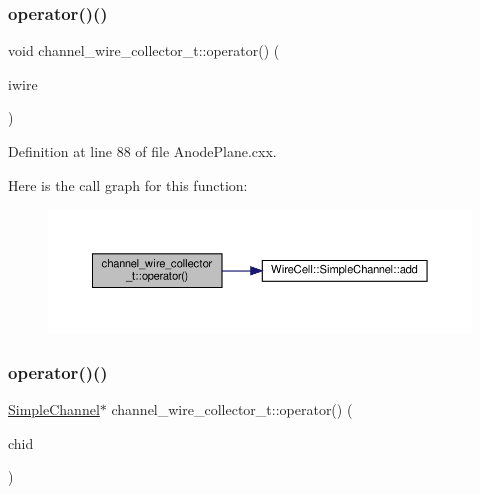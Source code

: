 \subsubsection{\texorpdfstring{operator()()}{operator()()}\hspace{0.1cm}{\footnotesize\ttfamily [1/2]}}
{\footnotesize\ttfamily void channel\+\_\+wire\+\_\+collector\+\_\+t\+::operator() (\begin{DoxyParamCaption}\item[{I\+Wire\+::pointer}]{iwire }\end{DoxyParamCaption})\hspace{0.3cm}{\ttfamily [inline]}}



Definition at line 88 of file Anode\+Plane.\+cxx.

Here is the call graph for this function\+:
\nopagebreak
\begin{figure}[H]
\begin{center}
\leavevmode
\includegraphics[width=350pt]{structchannel__wire__collector__t_a1cce7e63f629acde348371a8fcca6092_cgraph}
\end{center}
\end{figure}
\mbox{\label{structchannel__wire__collector__t_a54e5aa177339537c693c20c8b103c38d}} 
\subsubsection{\texorpdfstring{operator()()}{operator()()}\hspace{0.1cm}{\footnotesize\ttfamily [2/2]}}
{\footnotesize\ttfamily \hyperlink{class_wire_cell_1_1_simple_channel}{Simple\+Channel}$\ast$ channel\+\_\+wire\+\_\+collector\+\_\+t\+::operator() (\begin{DoxyParamCaption}\item[{int}]{chid }\end{DoxyParamCaption})\hspace{0.3cm}{\ttfamily [inline]}}




